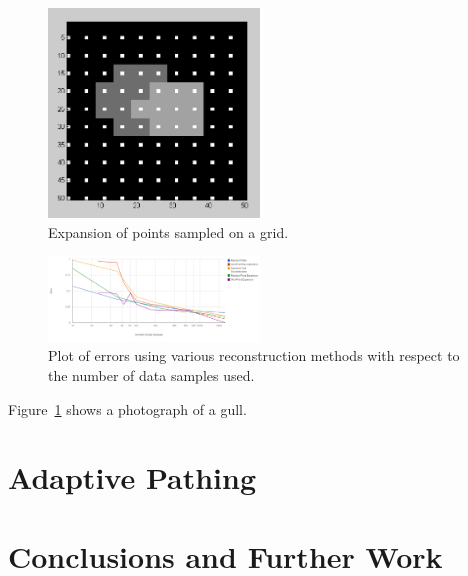 \documentclass[english]{article}\usepackage[]{graphicx}\usepackage[]{color}
\begin{document}
\begin{figure}[h!]
  \centering
    \includegraphics[width=0.5\textwidth]{figures/gridpointexpansion}
  \caption{Expansion of points sampled on a grid.}
  \label{fig:gridexp}
\end{figure}

\begin{figure}[h!]
  \centering
    \includegraphics[width=0.5\textwidth]{figures/othermethoderror}
  \caption{Plot of errors using various reconstruction methods with respect to the number of data samples used.}
  \label{fig:othermethoderror}
\end{figure}

Figure~\ref{fig:gridexp} shows a photograph of a gull.


\section{Adaptive Pathing}

\section{Conclusions and Further Work}
\end{document}
